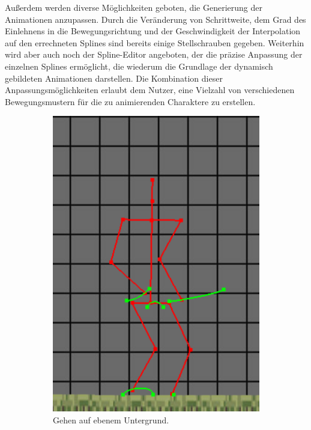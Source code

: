 Außerdem werden diverse Möglichkeiten geboten, die Generierung der Animationen anzupassen. Durch die Veränderung von Schrittweite, dem Grad des Einlehnens in die Bewegungsrichtung und der Geschwindigkeit der Interpolation auf den errechneten Splines sind bereits einige Stellschrauben gegeben. Weiterhin wird aber auch noch der Spline-Editor angeboten, der die präzise Anpassung der einzelnen Splines ermöglicht, die wiederum die Grundlage der dynamisch gebildeten Animationen darstellen. Die Kombination dieser Anpassungsmöglichkeiten erlaubt dem Nutzer, eine Vielzahl von verschiedenen Bewegungsmustern für die zu animierenden Charaktere zu erstellen.

\begin{figure}
    \centering
    \begin{subfigure}[t]{.4\linewidth}
        \centering
        \includegraphics[width=0.75\linewidth]{images/even_ground_slow.png}
        \caption{Gehen auf ebenem Untergrund.}
        \label{even_slow}
    \end{subfigure}
    \begin{subfigure}[t]{.4\linewidth}
        \centering

\end{subfigure}
\end{figure}
